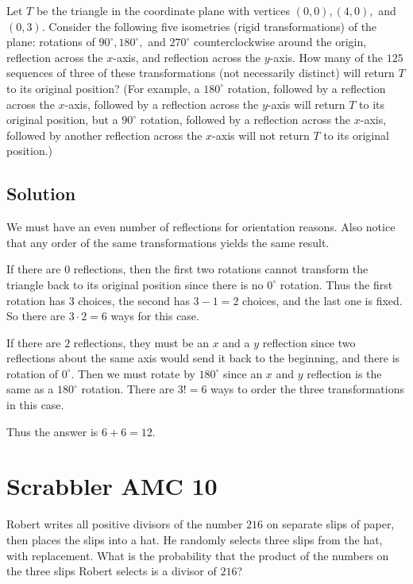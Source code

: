 \documentclass{article}
\begin{document}
Let $T$ be the triangle in the coordinate plane with vertices $(0,0), (4,0),$ and $(0,3).$ Consider the following five isometries (rigid transformations) of the plane: rotations of $90^{\circ}, 180^{\circ},$ and $270^{\circ}$ counterclockwise around the origin, reflection across the $x$-axis, and reflection across the $y$-axis. How many of the $125$ sequences of three of these transformations (not necessarily distinct) will return $T$ to its original position? (For example, a $180^{\circ}$ rotation, followed by a reflection across the $x$-axis, followed by a reflection across the $y$-axis will return $T$ to its original position, but a $90^{\circ}$ rotation, followed by a reflection across the $x$-axis, followed by another reflection across the $x$-axis will not return $T$ to its original position.)

\subsection{Solution}
We must have an even number of reflections for orientation reasons. Also notice that any order of the same transformations yields the same result.
    
If there are $0$ reflections, then the first two rotations cannot transform the triangle back to its original position since there is no $0^{\circ}$ rotation. Thus the first rotation has $3$ choices, the second has $3-1=2$ choices, and the last one is fixed. So there are $3\cdot 2=6$ ways for this case.
    
If there are $2$ reflections, they must be an $x$ and a $y$ reflection since two reflections about the same axis would send it back to the beginning, and there is rotation of $0^{\circ}.$ Then we must rotate by $180^{\circ}$ since an $x$ and $y$ reflection is the same as a $180^{\circ}$ rotation. There are $3!=6$ ways to order the three transformations in this case.
    
Thus the answer is $6+6=12.$

\pagebreak\section{Scrabbler AMC 10}

Robert writes all positive divisors of the number $216$ on separate slips of paper, then places the slips into a hat. He randomly selects three slips from the hat, with replacement. What is the probability that the product of the numbers on the three slips Robert selects is a divisor of $216$?
\end{document}
